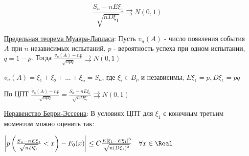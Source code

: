 \documentclass[12pt]{article}
\begin{document}
\begin{enumerate}
    \[\frac{S_n - nE\xi_1}{\sqrt{nD\xi_1}} \rightrightarrows N(0, 1)\]

    \hyperlink{limittheoremdemoivrelaplace}{Предельная теорема Муавра-Лапласа}: Пусть $v_n(A)$ - число появления события $A$ при $n$ независимых испытаний, $p$ - вероятность успеха при одном испытании, $q = 1 - p$.
    Тогда $\frac{v_n(A) - np}{\sqrt{npq}} \rightrightarrows N(0, 1)$

    \begin{MyProof}
        $v_n(A) = \xi_1 + \xi_2 + \dots + \xi_n = S_n$, где $\xi_i \in B_p$ и независимы, $E\xi_1 = p, D\xi_1 = pq$

        По ЦПТ $\frac{v_n(A) - np}{\sqrt{npq}} = \frac{S_n - nE\xi_1}{\sqrt{nD\xi_1}} \rightrightarrows N(0, 1)$
    \end{MyProof}

    \hyperlink{berryesseentheorem}{Неравенство Берри-Эссеена}: В условиях ЦПТ для $\xi_1$ с конечным третьим моментом можно оценить так:

    $\left|p\left(\frac{S_n - nE\xi_1}{\sqrt{nD\xi_1}} < x\right) - F_0(x)\right| \leq C\frac{E|\xi_1 - E\xi_1|^3}{\sqrt{n(D\xi_1)^3}} \quad \forall x \in \Real$


\end{enumerate}
\end{document}
